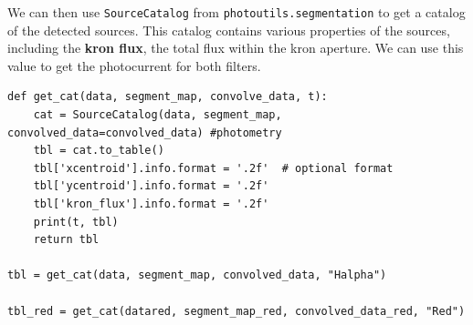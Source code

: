 \documentclass{article}
\begin{document}
We can then use \verb|SourceCatalog| from \verb|photoutils.segmentation| to get a catalog of the detected sources. This catalog contains various properties of the sources, including the \textbf{kron flux}, the total flux within the kron aperture. We can use this value to get the photocurrent for both filters.

\begin{verbatim}
def get_cat(data, segment_map, convolve_data, t):
    cat = SourceCatalog(data, segment_map, convolved_data=convolved_data) #photometry
    tbl = cat.to_table()
    tbl['xcentroid'].info.format = '.2f'  # optional format
    tbl['ycentroid'].info.format = '.2f'
    tbl['kron_flux'].info.format = '.2f'
    print(t, tbl)
    return tbl

tbl = get_cat(data, segment_map, convolved_data, "Halpha")

tbl_red = get_cat(datared, segment_map_red, convolved_data_red, "Red")
\end{verbatim}
\end{document}
